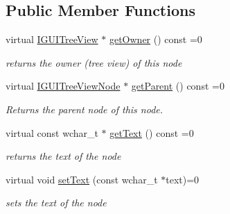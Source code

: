 \subsection*{Public Member Functions}
\begin{DoxyCompactItemize}
\item 
\mbox{\label{classirr_1_1gui_1_1IGUITreeViewNode_abbd99821712d9e32f222460dcad0858a}} 
virtual \hyperlink{classirr_1_1gui_1_1IGUITreeView}{I\+G\+U\+I\+Tree\+View} $\ast$ \hyperlink{classirr_1_1gui_1_1IGUITreeViewNode_abbd99821712d9e32f222460dcad0858a}{get\+Owner} () const =0
\begin{DoxyCompactList}\small\item\em returns the owner (tree view) of this node \end{DoxyCompactList}\item 
virtual \hyperlink{classirr_1_1gui_1_1IGUITreeViewNode}{I\+G\+U\+I\+Tree\+View\+Node} $\ast$ \hyperlink{classirr_1_1gui_1_1IGUITreeViewNode_a37d30138ae01528cb1213324c511d079}{get\+Parent} () const =0
\begin{DoxyCompactList}\small\item\em Returns the parent node of this node. \end{DoxyCompactList}\item 
\mbox{\label{classirr_1_1gui_1_1IGUITreeViewNode_a2d0d53b4dbada5aa332ba1756722bb1c}} 
virtual const wchar\+\_\+t $\ast$ \hyperlink{classirr_1_1gui_1_1IGUITreeViewNode_a2d0d53b4dbada5aa332ba1756722bb1c}{get\+Text} () const =0
\begin{DoxyCompactList}\small\item\em returns the text of the node \end{DoxyCompactList}\item 
\mbox{\label{classirr_1_1gui_1_1IGUITreeViewNode_a572a16938c907034e1e7b33b2851ad52}} 
virtual void \hyperlink{classirr_1_1gui_1_1IGUITreeViewNode_a572a16938c907034e1e7b33b2851ad52}{set\+Text} (const wchar\+\_\+t $\ast$text)=0
\begin{DoxyCompactList}\small\item\em sets the text of the node \end{DoxyCompactList}\item 
\mbox{\label{classirr_1_1gui_1_1IGUITreeViewNode_a67e7b71c369090f81d1f721bb4ca7035}} 

\end{DoxyCompactItemize}
